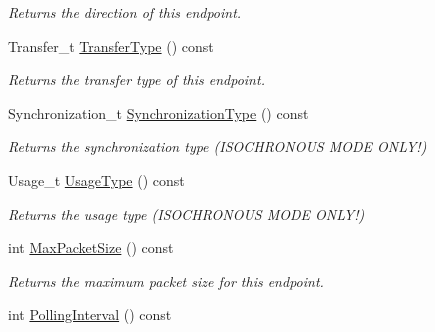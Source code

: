 \begin{DoxyCompactItemize}
\begin{DoxyCompactList}\small\item\em Returns the direction of this endpoint. \end{DoxyCompactList}\item 
\hypertarget{class_lib_u_s_b_1_1_endpoint_aa5b591898f33c0e2c684c22dadf50974}{Transfer\-\_\-t \hyperlink{class_lib_u_s_b_1_1_endpoint_aa5b591898f33c0e2c684c22dadf50974}{Transfer\-Type} () const }\label{class_lib_u_s_b_1_1_endpoint_aa5b591898f33c0e2c684c22dadf50974}

\begin{DoxyCompactList}\small\item\em Returns the transfer type of this endpoint. \end{DoxyCompactList}\item 
\hypertarget{class_lib_u_s_b_1_1_endpoint_a7cfbe2c62da0e8c84587ed05dc82a1e6}{Synchronization\-\_\-t \hyperlink{class_lib_u_s_b_1_1_endpoint_a7cfbe2c62da0e8c84587ed05dc82a1e6}{Synchronization\-Type} () const }\label{class_lib_u_s_b_1_1_endpoint_a7cfbe2c62da0e8c84587ed05dc82a1e6}

\begin{DoxyCompactList}\small\item\em Returns the synchronization type (I\-S\-O\-C\-H\-R\-O\-N\-O\-U\-S M\-O\-D\-E O\-N\-L\-Y!) \end{DoxyCompactList}\item 
\hypertarget{class_lib_u_s_b_1_1_endpoint_ad25de43b4d384489061382311505deed}{Usage\-\_\-t \hyperlink{class_lib_u_s_b_1_1_endpoint_ad25de43b4d384489061382311505deed}{Usage\-Type} () const }\label{class_lib_u_s_b_1_1_endpoint_ad25de43b4d384489061382311505deed}

\begin{DoxyCompactList}\small\item\em Returns the usage type (I\-S\-O\-C\-H\-R\-O\-N\-O\-U\-S M\-O\-D\-E O\-N\-L\-Y!) \end{DoxyCompactList}\item 
\hypertarget{class_lib_u_s_b_1_1_endpoint_a82abc743029a6ae25950509b0a389c7b}{int \hyperlink{class_lib_u_s_b_1_1_endpoint_a82abc743029a6ae25950509b0a389c7b}{Max\-Packet\-Size} () const }\label{class_lib_u_s_b_1_1_endpoint_a82abc743029a6ae25950509b0a389c7b}

\begin{DoxyCompactList}\small\item\em Returns the maximum packet size for this endpoint. \end{DoxyCompactList}\item 
\hypertarget{class_lib_u_s_b_1_1_endpoint_a5082b5c139a3585d8b7277a273c1effc}{int \hyperlink{class_lib_u_s_b_1_1_endpoint_a5082b5c139a3585d8b7277a273c1effc}{Polling\-Interval} () const }\label{class_lib_u_s_b_1_1_endpoint_a5082b5c139a3585d8b7277a273c1effc}


\end{DoxyCompactItemize}
